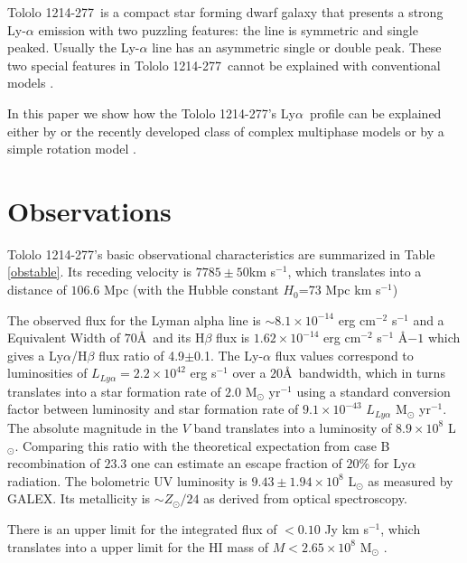 \documentclass[a4,useAMS,usenatbib,usegraphicx]{mn2e}
\newcommand{\tol}{Tololo 1214-277}
\newcommand{\lya}{Ly$\alpha$}
\begin{document}
\tol\ is a compact star forming dwarf galaxy that presents a
strong Ly-$\alpha$ emission \citep{Thuan97} with two puzzling 
features: the line is symmetric and single peaked.
Usually the Ly-$\alpha$ line has an asymmetric single or double peak. 
These two special features in \tol\ cannot be explained with
conventional models \citep{2006A&A...460..397V,2015ApJ...812..123G}.  

In this paper we show how the \tol's \lya\ profile can be explained
either by  or the recently developed class of complex multiphase models 
\citep{Gronke2016} or by a simple rotation model
\citep{GaravitoCamargo2014}. 
\section{Observations}


\tol's basic observational characteristics are summarized in Table \ref{obstable}.
Its receding velocity is $7785\pm 50$km s$^{-1}$, which translates
into a distance of $106.6$ Mpc (with the Hubble constant $H_{0}$=73
Mpc km s$^{-1}$) 



The observed flux for the Lyman alpha line is $\sim
8.1\times 10^{-14}$ erg cm$^{-2}$ s$^{-1}$ \citep{Thuan97}
and a Equivalent Width of $70$\AA\ and its H$\beta$ flux is 
$1.62\times 10^{-14}$ erg cm$^{-2}$ s$^{-1}$ \AA${-1}$
\citep{Izotov04} which gives a Ly$\alpha$/H$\beta$ flux ratio of
4.9$\pm$0.1. The Ly-$\alpha$ flux values correspond to luminosities of
$L_{Ly\alpha}=2.2\times 10^{42}$ erg s$^{-1}$ over a $20$\AA\ 
bandwidth, which in turns translates  into a star formation rate of
$2.0$ M$_{\odot}$ yr$^{-1}$ using a standard conversion factor between
luminosity and star formation rate of $9.1\times 10^{-43}$
$L_{Ly\alpha}$ M$_{\odot}$ yr$^{-1}$. 
The absolute magnitude in the $V$ band translates into a luminosity of
$8.9\times 10^{8}$ L$_{\odot}$.
Comparing this ratio with the theoretical expectation from case B
recombination of $23.3$ \citep{Hummer1987} one can estimate an escape
fraction of $20$\% for Ly$\alpha$ radiation.
The bolometric UV luminosity is $9.43\pm1.94 \times 10^{8}$
L$_{\odot}$ as measured by GALEX. Its metallicity is $\sim
Z_{\odot}/24$ \citep{Izotov04} as derived from optical spectroscopy.   


There is an upper limit for the  
integrated flux of $<0.10$ Jy km s$^{-1}$, which translates into a
upper limit for the HI mass of $M<2.65\times 10^{8}$ M$_{\odot}$
\citep{pustilnikmartin07}.  
\end{document}
